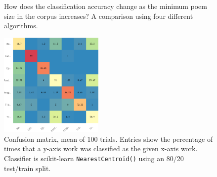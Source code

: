 \documentclass[twocolumn, switch, a4paper]{article} %
\begin{document}
\begin{figure}
  \caption{How does the classification accuracy change as the minimum poem
  size in the corpus increases? A comparison using four different algorithms.}
  \label{fig:poetics_acc}
  \centering
  \qquad
\end{figure}

\begin{figure}
\caption{
  Confusion matrix, mean of 100 trials. Entries show the percentage of times
that a y-axis work was classified as the given x-axis work. Classifier is
scikit-learn \texttt{NearestCentroid()} using an 80/20 test/train split.}
\label{fig:cm_poetics}
\includegraphics[width=0.45\textwidth]{figures/cm_poetics-crop.pdf}
\end{figure}
\end{document}

